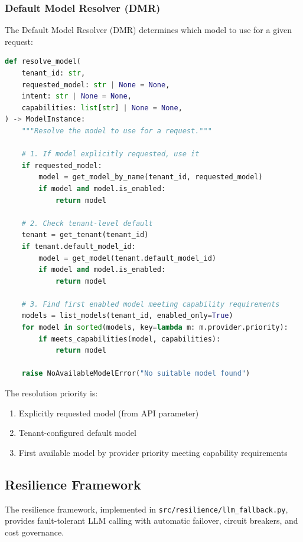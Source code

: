 \subsubsection{Default Model Resolver (DMR)}

The Default Model Resolver (DMR) determines which model to use for a given request:

\begin{lstlisting}[language=Python, caption={Default model resolution logic}, label=lst:dmr-resolution]
def resolve_model(
    tenant_id: str,
    requested_model: str | None = None,
    intent: str | None = None,
    capabilities: list[str] | None = None,
) -> ModelInstance:
    """Resolve the model to use for a request."""
    
    # 1. If model explicitly requested, use it
    if requested_model:
        model = get_model_by_name(tenant_id, requested_model)
        if model and model.is_enabled:
            return model
    
    # 2. Check tenant-level default
    tenant = get_tenant(tenant_id)
    if tenant.default_model_id:
        model = get_model(tenant.default_model_id)
        if model and model.is_enabled:
            return model
    
    # 3. Find first enabled model meeting capability requirements
    models = list_models(tenant_id, enabled_only=True)
    for model in sorted(models, key=lambda m: m.provider.priority):
        if meets_capabilities(model, capabilities):
            return model
    
    raise NoAvailableModelError("No suitable model found")
\end{lstlisting}

The resolution priority is:
\begin{enumerate}
    \item Explicitly requested model (from API parameter)
    \item Tenant-configured default model
    \item First available model by provider priority meeting capability requirements
\end{enumerate}

\subsection{Resilience Framework}
\label{subsec:resilience-framework}

The resilience framework, implemented in \texttt{src/resilience/llm\_fallback.py}, provides fault-tolerant LLM calling with automatic failover, circuit breakers, and cost governance.

